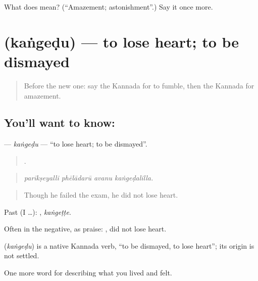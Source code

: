 \begin{tcolorbox}[breakable,colback=teal!4,colframe=teal!35!black,title={Before you move on}]
What does  mean? (\textquotedblleft{}Amazement; astonishment\textquotedblright{}.) Say it once more.
\end{tcolorbox}
\section[\texorpdfstring{\kn{ಕಂಗೆಡು} (kaṅgeḍu)}{ಕಂಗೆಡು (kaṅgeḍu)}]{ (kaṅgeḍu) — to lose heart; to be dismayed}

\label{lesson:KA-C494-kangedu}



\begin{quote}
Before the new one: say the Kannada for to fumble, then the Kannada for amazement.
\end{quote}

\subsection*{You'll want to know: }
\textbf{} — \emph{kaṅgeḍu} — \textquotedblleft{}to lose heart; to be dismayed\textquotedblright{}.

\begin{quote}
   .
\end{quote}

\begin{quote}
\emph{parīkṣeyalli phēlādarū avanu kaṅgeḍalilla.}
\end{quote}

\begin{quote}
Though he failed the exam, he did not lose heart.
\end{quote}

Past (I …): , \emph{kaṅgeṭṭe}.

Often in the negative, as praise: , did not lose heart.

\begin{cousinweb}
\textbf{} (\emph{kaṅgeḍu}) is a native Kannada verb, \textquotedblleft{}to be dismayed, to lose heart\textquotedblright{}; its origin is not settled.
\end{cousinweb}

\begin{grammarlens}[title={What you've built}]
One more word for describing what you lived and felt.
\end{grammarlens}

